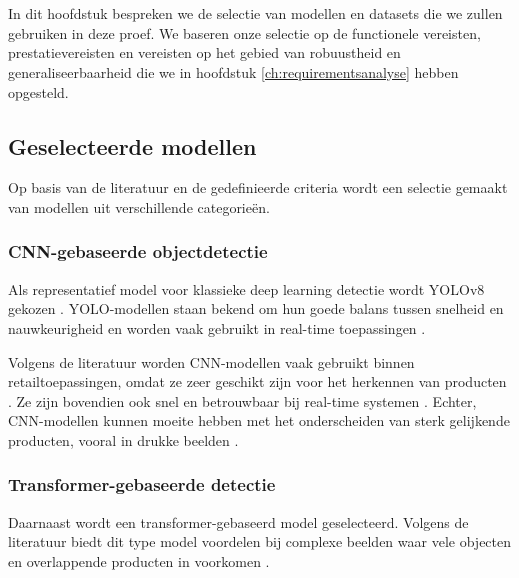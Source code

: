 \chapter{}%
\label{ch:selectie}


In dit hoofdstuk bespreken we de selectie van modellen en datasets die we zullen gebruiken in deze proef. We baseren onze selectie op de functionele vereisten, prestatievereisten en vereisten op het gebied van robuustheid en generaliseerbaarheid die we in hoofdstuk \ref{ch:requirementsanalyse} hebben opgesteld.

\section{Geselecteerde modellen}

Op basis van de literatuur en de gedefinieerde criteria wordt een selectie gemaakt van modellen uit verschillende categorieën.

\subsection{CNN-gebaseerde objectdetectie}

Als representatief model voor klassieke deep learning detectie wordt YOLOv8 gekozen \autocite{yolov8_ultralytics}. YOLO-modellen staan bekend om hun goede balans tussen snelheid en nauwkeurigheid en worden vaak gebruikt in real-time toepassingen \autocite{ultralytics_docs}.

Volgens de literatuur worden CNN-modellen vaak gebruikt binnen retailtoepassingen, omdat ze zeer geschikt zijn voor het herkennen van producten \autocite{MELEK2024108452}. Ze zijn bovendien ook snel en betrouwbaar bij real-time systemen \autocite{chadha2025vision}. 
Echter, CNN-modellen kunnen moeite hebben met het onderscheiden van sterk gelijkende producten, vooral in drukke beelden \autocite{PETTERSSON202410549}.

\subsection{Transformer-gebaseerde detectie}

Daarnaast wordt een transformer-gebaseerd model geselecteerd. Volgens de literatuur biedt dit type model voordelen bij complexe beelden waar vele objecten en overlappende producten in voorkomen \autocite{zhu2021}.

